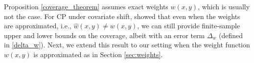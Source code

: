 Proposition \ref{coverage_theorem} assumes  exact weights $w(x, y)$, which is usually not the case. For CP under covariate shift, \cite{lei2020conformal} showed that even when the weights are approximated, i.e., $\hat{w}(x, y) \neq w(x, y)$, we can still provide finite-sample upper and lower bounds on the coverage, albeit with an error term $\Delta_w$ (defined in \eqref{delta_w}). Next, we extend this result to our setting when the weight function $w(x, y)$ is approximated as in Section \ref{sec:weights}.


